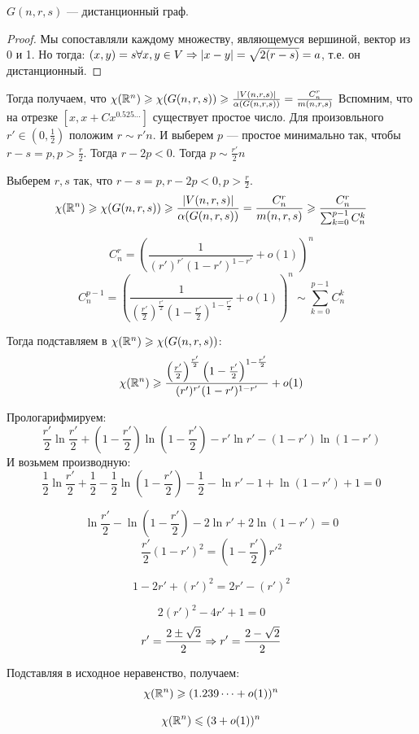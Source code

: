 \begin{note}
    \(G(n, r, s)\) --- дистанционный граф.
\end{note}
\begin{proof}
    Мы сопоставляли каждому множеству, являющемуся вершиной, вектор из 0 и 1. Но тогда: \((x, y) = s \forall x, y \in V \Rightarrow |x - y| = \sqrt{2(r - s)} = a\), т.е. он дистанционный.
\end{proof}

Тогда получаем, что \(\chi(\mathbb{R}^n) \geqslant \chi(G(n, r, s)) \geqslant \frac{|V(n, r, s)|}{\alpha(G(n, r, s))} = \frac{C_n^r}{m(n, r, s)}\)
Вспомним, что на отрезке \([x, x + Cx^{0.525\dots}]\) существует простое число. Для произовльного \(r' \in \left( 0, \frac{1}{2} \right)\) положим \(r \sim r'n\). И выберем \(p\) --- простое минимально так, чтобы \(r - s = p, p > \frac{r}{2}\). Тогда \(r - 2p < 0\). Тогда \(p \sim \frac{r'}{2}n\)

Выберем \(r, s\) так, что \(r - s = p, r - 2p < 0, p > \frac{r}{2}\).
\[\chi(\mathbb{R}^n) \geqslant \chi(G(n, r, s)) \geqslant \frac{|V(n, r, s)|}{\alpha(G(n, r, s))} = \frac{C_n^r}{m(n, r, s)} \geqslant \frac{C_n^r}{\sum_{k = 0}^{p - 1}C_n^k}\]

\[C_n^r = \left( \frac{1}{(r')^{r'}(1 - r')^{1 - r'}}  + o(1)\right)^n\]
\[C_n^{p - 1} = \left( \frac{1}{\left( \frac{r'}{2} \right)^{\frac{r'}{2}}\left( 1 - \frac{r'}{2} \right)^{1 - \frac{r'}{2}}} + o(1) \right)^n \sim \sum_{k = 0}^{p - 1}C_n^k\]

Тогда подставляем в \(\chi(\mathbb{R}^n) \geqslant \chi(G(n, r, s))\):
\[\chi(\mathbb{R}^n) \geqslant \frac{\left( \frac{r'}{2} \right)^{\frac{r'}{2}}\left( 1 - \frac{r'}{2} \right)^{1 - \frac{r'}{2}}}{(r')^{r'}(1 - r')^{1 - r'}} + o(1)\]

Прологарифмируем:
\[\frac{r'}{2}\ln \frac{r'}{2} + \left( 1 - \frac{r'}{2} \right)\ln \left( 1 - \frac{r'}{2} \right) - r'\ln r' - (1 - r')\ln (1 - r')\]
И возьмем производную:
\[\frac{1}{2}\ln \frac{r'}{2} + \frac{1}{2} - \frac{1}{2}\ln\left( 1 - \frac{r'}{2} \right) - \frac{1}{2} - \ln r' - 1 + \ln(1 - r') + 1 = 0\]

\[\ln \frac{r'}{2} - \ln\left( 1 - \frac{r'}{2} \right) - 2\ln r' + 2\ln(1 - r') = 0\]
\[\frac{r'}{2}(1 - r')^2 = \left( 1 - \frac{r'}{2} \right)r'^2\]

\[1 - 2r' + (r')^2 = 2r' - (r')^2\]

\[2(r')^2 - 4r' + 1 = 0\]
\[r' = \frac{2 \pm \sqrt{2}}{2} \Rightarrow r' = \frac{2 - \sqrt{2}}{2}\]

Подставляя в исходное неравенство, получаем:
\[\chi(\mathbb{R}^n) \geqslant (1.239\dots + o(1))^n\]

\begin{theorem}
    \[\chi(\mathbb{R}^n) \leqslant (3 + o(1))^n\]
\end{theorem}

